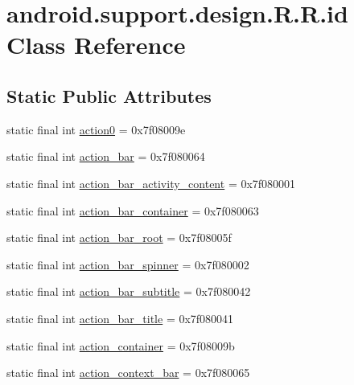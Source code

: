 \hypertarget{classandroid_1_1support_1_1design_1_1_r_1_1id}{
\section{android.support.design.R.R.id Class Reference}
\label{classandroid_1_1support_1_1design_1_1_r_1_1id}
}
\subsection*{Static Public Attributes}
\begin{CompactItemize}
\item 
static final int \hyperlink{classandroid_1_1support_1_1design_1_1_r_1_1id_1938dcbc082e7d1e0b58530c4945f99f}{action0} = 0x7f08009e
\item 
static final int \hyperlink{classandroid_1_1support_1_1design_1_1_r_1_1id_64880d07a7243183697c19309c206f2b}{action\_\-bar} = 0x7f080064
\item 
static final int \hyperlink{classandroid_1_1support_1_1design_1_1_r_1_1id_ec99d76af19343009e9fabe0ca983ca4}{action\_\-bar\_\-activity\_\-content} = 0x7f080001
\item 
static final int \hyperlink{classandroid_1_1support_1_1design_1_1_r_1_1id_4f0bc7019b1a4d62a26028cea870b197}{action\_\-bar\_\-container} = 0x7f080063
\item 
static final int \hyperlink{classandroid_1_1support_1_1design_1_1_r_1_1id_fe6825449ac526fae062a2ac6358ebe2}{action\_\-bar\_\-root} = 0x7f08005f
\item 
static final int \hyperlink{classandroid_1_1support_1_1design_1_1_r_1_1id_2475bef8afd54ad01faaf5748d493575}{action\_\-bar\_\-spinner} = 0x7f080002
\item 
static final int \hyperlink{classandroid_1_1support_1_1design_1_1_r_1_1id_2d3762bdbafda3ae0633985dbfb6d6bd}{action\_\-bar\_\-subtitle} = 0x7f080042
\item 
static final int \hyperlink{classandroid_1_1support_1_1design_1_1_r_1_1id_b84441897ac6e9829361490f70a8425f}{action\_\-bar\_\-title} = 0x7f080041
\item 
static final int \hyperlink{classandroid_1_1support_1_1design_1_1_r_1_1id_33d7ae788e0e123ae5e145738a2bab7f}{action\_\-container} = 0x7f08009b
\item 
static final int \hyperlink{classandroid_1_1support_1_1design_1_1_r_1_1id_6fac0bfa3f60b60afed63cda2ffbd2da}{action\_\-context\_\-bar} = 0x7f080065
\item 

\end{CompactItemize}
